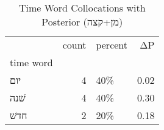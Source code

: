\begin{table}[htbp!]
\centering
\caption{Time Word Collocations with Posterior (מן+קצה)}
\label{table:postמן+קצה_head_cpd}
\begin{tabular}{lrlr}
\toprule
{} &  count & percent &    ΔP \\
time word &        &         &       \\
\midrule
יום       &      4 &     40\% &  0.02 \\
שׁנה      &      4 &     40\% &  0.30 \\
חדשׁ      &      2 &     20\% &  0.18 \\
\bottomrule
\end{tabular}
\end{table}
